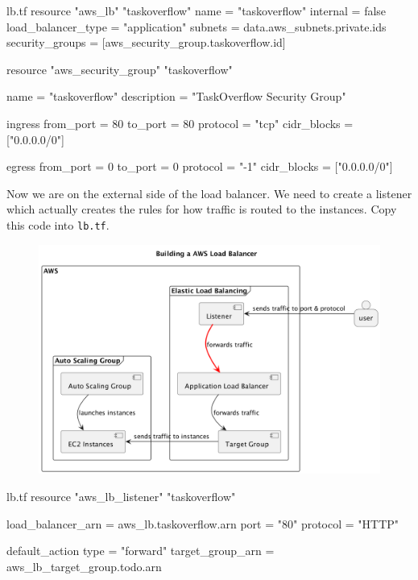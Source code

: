 \documentclass{csse4400}
\begin{document}
\begin{code}[language=terraform,numbers=none,keepspaces=true]{lb.tf}
resource "aws_lb" "taskoverflow" {
  name               = "taskoverflow"
  internal           = false
  load_balancer_type = "application"
  subnets            = data.aws_subnets.private.ids
  security_groups    = [aws_security_group.taskoverflow.id]
}

resource "aws_security_group" "taskoverflow" {
  name          = "taskoverflow"
  description   = "TaskOverflow Security Group"

  ingress {
    from_port   = 80
    to_port     = 80
    protocol    = "tcp"
    cidr_blocks = ["0.0.0.0/0"]
  }

  egress {
    from_port   = 0
    to_port     = 0
    protocol    = "-1"
    cidr_blocks = ["0.0.0.0/0"]
  }
}
\end{code}

Now we are on the external side of the load balancer.
We need to create a listener which actually creates the rules for how traffic is routed to the instances.
Copy this code into \texttt{lb.tf}.

\begin{figure}[H]
  \begin{center}
    \includegraphics[scale=0.2]{diagrams/lb4}
  \end{center}
\end{figure}

\begin{code}[language=terraform,numbers=none,keepspaces=true]{lb.tf}
resource "aws_lb_listener" "taskoverflow" {
  load_balancer_arn = aws_lb.taskoverflow.arn
  port              = "80"
  protocol          = "HTTP"

  default_action {
    type             = "forward"
    target_group_arn = aws_lb_target_group.todo.arn
  }
}
\end{code}
\end{document}
